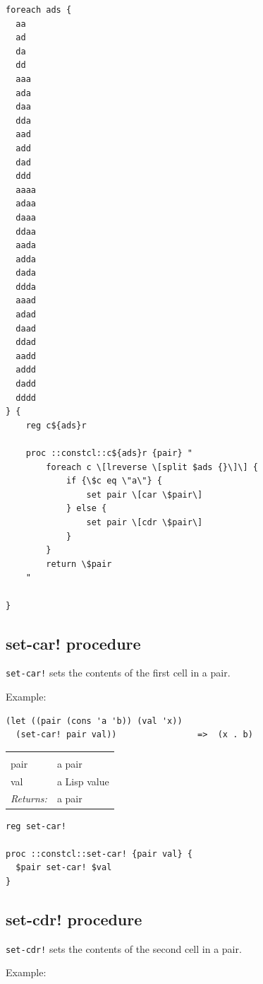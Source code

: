 \documentclass[twoside,9pt]{report}
\begin{document}
\begin{lstlisting}
foreach ads {
  aa
  ad
  da
  dd
  aaa
  ada
  daa
  dda
  aad
  add
  dad
  ddd
  aaaa
  adaa
  daaa
  ddaa
  aada
  adda
  dada
  ddda
  aaad
  adad
  daad
  ddad
  aadd
  addd
  dadd
  dddd
} {
    reg c${ads}r
 
    proc ::constcl::c${ads}r {pair} "
        foreach c \[lreverse \[split $ads {}\]\] {
            if {\$c eq \"a\"} {
                set pair \[car \$pair\]
            } else {
                set pair \[cdr \$pair\]
            }
        }
        return \$pair
    "
 
}
\end{lstlisting}
\subsection{set-car! procedure}
\label{set-car"!-procedure}


\texttt{set-car!} sets the contents of the first cell in a pair.



Example:

\begin{verbatim}
(let ((pair (cons 'a 'b)) (val 'x))
  (set-car! pair val))                =>  (x . b)
\end{verbatim}
\noindent\begin{tabular}{ |p{1.5cm} p{8cm}| }
\hline
\rowcolor[HTML]{CCCCCC} \multicolumn{2}{|l|}{\bf set-car! (public)} \\
pair & a pair \\
val & a Lisp value \\
\textit{Returns:} & a pair \\
\hline
\end{tabular}
\begin{lstlisting}
reg set-car!
 
proc ::constcl::set-car! {pair val} {
  $pair set-car! $val
}
\end{lstlisting}
\subsection{set-cdr! procedure}
\label{set-cdr"!-procedure}


\texttt{set-cdr!} sets the contents of the second cell in a pair.



Example:
\end{document}

